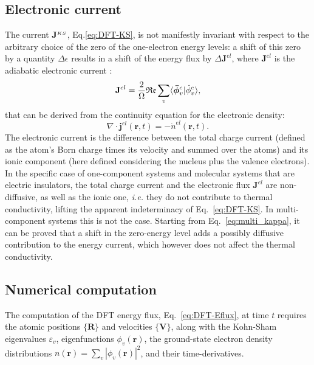 \subsection{Electronic current}  \label{sec:dft-electronic-curr}
The current $\mathbf{J}^{\scriptscriptstyle KS}$, Eq.\eqref{eq:DFT-KS}, is not manifestly invariant with respect to the arbitrary choice of the zero of the one-electron energy levels: a shift of this zero by a quantity $\Delta\epsilon$ results in a shift of the energy flux by $\Delta \mathbf{J}^{el}$, where $\mathbf{J}^{el}$ is the adiabatic electronic current \cite{Thouless1983}:
\begin{equation}
 \mathbf J^{el} = \frac{2}{\rOmega}\mathfrak{Re} \sum_{v} \langle\bm{\bar \phi}_v^c |\dot \phi_v^c \rangle, \label{eq:DFT-electronic}
\end{equation}
that can be derived from the continuity equation for the electronic density:
\begin{equation}
\nabla\cdot \bm j^{el}(\bm r,t) =- \dot{n}^{el}(\bm r,t).    
\end{equation}
The electronic current is the difference between the total charge current (defined as the atom's Born charge times its velocity and summed over the atoms) and its ionic component (here defined considering the nucleus plus the valence electrons). 
In the specific case of one-component systems and molecular systems that are electric insulators, the total charge current and the electronic flux $\mathbf{J}^{el}$ are non-diffusive, as well as the ionic one, \emph{i.e.} they do not contribute to thermal conductivity, lifting the apparent indeterminacy of Eq.~\eqref{eq:DFT-KS}. 
In multi-component systems this is not the case. 
Starting from Eq.~\eqref{eq:multi_kappa}, it can be proved that a shift in the zero-energy level adds a possibly diffusive contribution to the energy current, which however does not affect the thermal conductivity. 



\subsection{Numerical computation}  \label{sec:dft-hc-computation}
The computation of the DFT energy flux, Eq.~\eqref{eq:DFT-Eflux}, at time $t$ requires the atomic positions $\{\mathbf{R}\}$ and velocities $\{\mathbf{V}\}$, along with the Kohn-Sham eigenvalues $\varepsilon_v$, eigenfunctions $\phi_v(\mathbf{r})$, the ground-state electron density distributions $n(\mathbf{r}) = \sum_v |\phi_v(\mathbf{r})|^2$, and their time-derivatives. 

